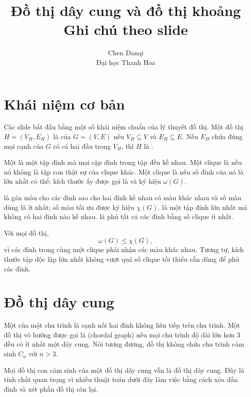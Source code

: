 \documentclass[11pt]{article}
\title{Đồ thị dây cung và đồ thị khoảng\\{\large Ghi chú theo slide}}
\author{Chen Danqi\\Đại học Thanh Hoa}
\date{}
\begin{document}
\maketitle


\section{Khái niệm cơ bản}

Các slide bắt đầu bằng một số khái niệm chuẩn của lý thuyết đồ thị.
Một đồ thị \(H=(V_H,E_H)\) là  của \(G=(V,E)\) nếu
\(V_H\subseteq V\) và \(E_H\subseteq E\). Nếu \(E_H\) chứa đúng mọi cạnh của
\(G\) có cả hai đầu trong \(V_H\), thì \(H\) là .

Một  là một tập đỉnh mà mọi cặp đỉnh trong tập đều kề nhau.
Một clique là  nếu nó không là tập con thật sự của clique khác.
Một clique là  nếu số đỉnh của nó là lớn nhất có thể; kích
thước ấy được gọi là  và ký hiệu \(\omega(G)\).

 là gán màu cho các đỉnh sao cho hai đỉnh kề nhau có
màu khác nhau và số màu dùng là ít nhất; số màu tối ưu được ký hiệu
\(\chi(G)\).  là một tập đỉnh lớn nhất mà không có
hai đỉnh nào kề nhau.  là phủ tất cả các đỉnh
bằng số clique ít nhất.

Với mọi đồ thị,
\[
  \omega(G)\le \chi(G),
\]
vì các đỉnh trong cùng một clique phải nhận các màu khác nhau. Tương tự,
kích thước tập độc lập lớn nhất không vượt quá số clique tối thiểu cần dùng
để phủ các đỉnh.

\section{Đồ thị dây cung}

Một  của một chu trình là cạnh nối hai đỉnh không liên tiếp
trên chu trình. Một đồ thị vô hướng được gọi là 
(chordal graph) nếu mọi chu trình độ dài lớn hơn \(3\) đều có ít nhất một dây
cung. Nói tương đương, đồ thị không chứa chu trình cảm sinh \(C_n\) với
\(n>3\).

Mọi đồ thị con cảm sinh của một đồ thị dây cung vẫn là đồ thị dây cung. Đây
là tính chất quan trọng vì nhiều thuật toán dưới đây làm việc bằng cách xóa
dần đỉnh và xét phần đồ thị còn lại.
\end{document}
